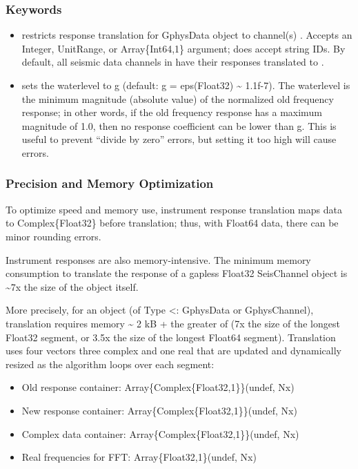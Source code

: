 \documentclass[letterpaper,11pt,english]{sphinxmanual}
\begin{document}
\subsubsection{Keywords}
\label{\detokenize{src/Processing/processing:id3}}\begin{itemize}
\item {} 
 restricts response translation for GphysData object  to channel(s) . Accepts an Integer, UnitRange, or Array\{Int64,1\} argument; does  accept string IDs. By default, all seismic data channels in  have their responses translated to .

\item {} 
 sets the waterlevel to g (default: g = eps(Float32) \textasciitilde{} 1.1f-7). The waterlevel is the minimum magnitude (absolute value) of the normalized old frequency response; in other words, if the old frequency response has a maximum magnitude of 1.0, then no response coefficient can be lower than g. This is useful to prevent “divide by zero” errors, but setting it too high will cause errors.

\end{itemize}


\subsubsection{Precision and Memory Optimization}
\label{\detokenize{src/Processing/processing:precision-and-memory-optimization}}
To optimize speed and memory use, instrument response translation maps data to
Complex\{Float32\} before translation; thus, with Float64 data, there can be
minor rounding errors.

Instrument responses are also memory-intensive. The minimum memory consumption
to translate the response of a gapless Float32 SeisChannel object is \textasciitilde{}7x the
size of the object itself.

More precisely, for an object  (of Type \textless{}: GphysData or GphysChannel),
translation requires memory \textasciitilde{} 2 kB + the greater of (7x the size of the longest
Float32 segment, or 3.5x the size of the longest Float64 segment). Translation
uses four vectors \textendash{} three complex and one real \textendash{} that are updated and
dynamically resized as the algorithm loops over each segment:
\begin{itemize}
\item {} 
Old response container: Array\{Complex\{Float32,1\}\}(undef, Nx)

\item {} 
New response container: Array\{Complex\{Float32,1\}\}(undef, Nx)

\item {} 
Complex data container: Array\{Complex\{Float32,1\}\}(undef, Nx)

\item {} 
Real frequencies for FFT: Array\{Float32,1\}(undef, Nx)

\end{itemize}
\end{document}

